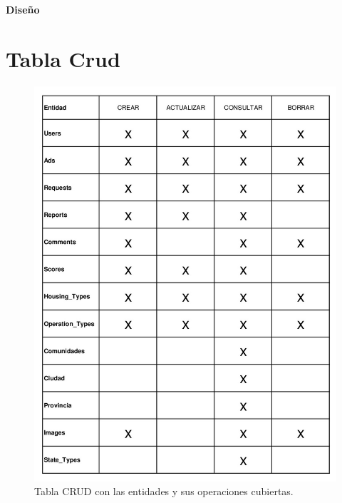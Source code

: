 \newpage{\pagestyle{empty}\cleardoublepage}
\newpage
\vspace*{\fill}
    \begin{center}
      \thispagestyle{empty} \vspace*{0cm} \textbf{\huge
Dise\~{n}o}
    \end{center}
    \vspace*{\fill}
\newpage{\pagestyle{empty}\cleardoublepage}
\chapter{Tabla Crud}


\begin{figure}[h]
\centering
\includegraphics[width=.7\textwidth]{Img/Disenyo/TABLA_CRUD.jpg}
\caption{Tabla CRUD con las entidades y sus operaciones cubiertas.}
\label{fig:dcu}
\end{figure}